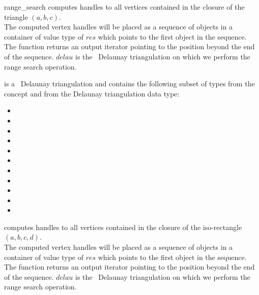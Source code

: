 \begin{ccRefFunction}{range_search}
{computes handles to all vertices contained in the closure of the triangle $(a,b,c)$.\\
The computed vertex handles will be placed as a sequence of objects in a container of value type
of $res$
which points to the first object in the sequence. The function
returns an output iterator pointing to the position beyond the end
of the sequence. 
$delau$ is the \cgal\ Delaunay triangulation on which we perform the range search operation.}

 is a \cgal\ Delaunay triangulation and contains the following subset of types from the concept  and from
the Delaunay triangulation data type:
\begin{itemize}
  \item {} 
  \item {}
  \item {} 
  \item {}   
  \item {} 
  \item {}  
  \item {}  
  \item {} 
  \item {} 
  \item {} 
  \item {}  
\end{itemize}


{computes handles to all vertices contained in the closure of the iso-rectangle $(a,b,c,d)$.\\
The computed vertex handles will be placed as a sequence of objects in a container of value type
of $res$
which points to the first object in the sequence. The function
returns an output iterator pointing to the position beyond the end
of the sequence. $delau$ is the \cgal\ Delaunay triangulation on which we perform the range search operation.} 


\end{ccRefFunction}
